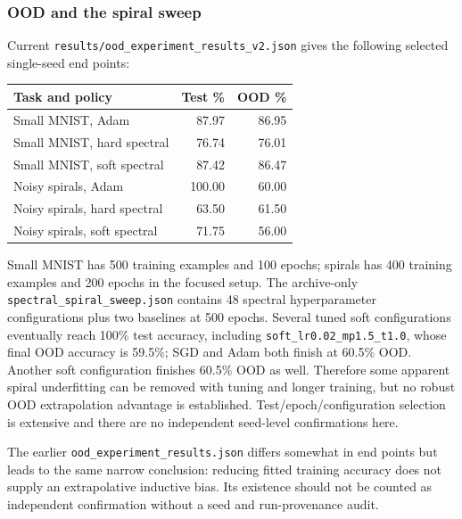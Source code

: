 \documentclass[
  british,
  10pt,
  a4paper,
]{article}
\newcounter{none} %
\begin{document}
\subsubsection{OOD and the spiral
sweep}\label{classical-evidence--ood-and-the-spiral-sweep}

Current
\texttt{results/\allowbreak{}ood\_\allowbreak{}experiment\_\allowbreak{}results\_\allowbreak{}v2.\allowbreak{}json}
gives the following selected single-\allowbreak{}seed end points:

{\def\LTcaptype{none} %
\begin{longtable}[]{@{}lrr@{}}
\toprule\noalign{}
Task and policy & Test \% & OOD \% \\
\midrule\noalign{}
\endhead
\bottomrule\noalign{}
\endlastfoot
Small MNIST, Adam & 87.97 & 86.95 \\
Small MNIST, hard spectral & 76.74 & 76.01 \\
Small MNIST, soft spectral & 87.42 & 86.47 \\
Noisy spirals, Adam & 100.00 & 60.00 \\
Noisy spirals, hard spectral & 63.50 & 61.50 \\
Noisy spirals, soft spectral & 71.75 & 56.00 \\
\end{longtable}
}

Small MNIST has 500 training examples and 100 epochs; spirals has 400
training examples and 200 epochs in the focused setup. The
archive-\allowbreak{}only
\texttt{spectral\_\allowbreak{}spiral\_\allowbreak{}sweep.\allowbreak{}json}
contains 48 spectral hyperparameter configurations plus two baselines at
500 epochs. Several tuned soft configurations eventually reach 100\%
test accuracy, including
\texttt{soft\_\allowbreak{}lr0.\allowbreak{}02\_\allowbreak{}mp1.\allowbreak{}5\_\allowbreak{}t1.\allowbreak{}0},
whose final OOD accuracy is 59.5\%; SGD and Adam both finish at 60.5\%
OOD. Another soft configuration finishes 60.5\% OOD as well. Therefore
some apparent spiral underfitting can be removed with tuning and longer
training, but no robust OOD extrapolation advantage is
established.\allowbreak{}
Test/\allowbreak{}epoch/\allowbreak{}configuratio\allowbreak{}n
selection is extensive and there are no independent seed-level
confirmations here.

The earlier
\texttt{ood\_\allowbreak{}experiment\_\allowbreak{}results.\allowbreak{}json}
differs somewhat in end points but leads to the same narrow conclusion:
reducing fitted training accuracy does not supply an extrapolative
inductive bias. Its existence should not be counted as independent
confirmation without a seed and run-\allowbreak{}provenance audit.
\end{document}
